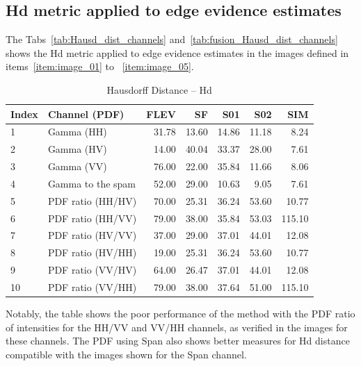 \documentclass[remotesensing,article,submit,pdftex,moreauthors]{Definitions/mdpi}
\begin{document}
\subsection{Hd metric applied to edge evidence estimates}
The Tabs~\eqref{tab:Hausd_dist_channels} and~\eqref{tab:fusion_Hausd_dist_channels} shows the Hd metric applied to edge evidence estimates in the images defined in items~\ref{item:image_01} to ~\ref{item:image_05}.
\begin{table}[hbt!]
	\centering
	\caption{Hausdorff Distance -- Hd}\label{tab:Hausd_dist_channels}
	\begin{tabular}{@{}llrrrrr@{}} \toprule
		 Index & Channel (PDF) & FLEV   & SF    & S01    & S02    & SIM\\ \midrule
	1	&Gamma (HH)            & 31.78  & 13.60 & 14.86  & 11.18  &  8.24\\
	2	&Gamma (HV)            & 14.00  & 40.04 & 33.37  & 28.00  &  7.61\\ 
        3   &Gamma (VV)        & 76.00  & 22.00 & 35.84  & 11.66  &  8.06\\
        4   &Gamma to the spam & 52.00  & 29.00 & 10.63  &  9.05  &  7.61\\
        5   &PDF ratio (HH/HV) & 70.00  & 25.31 & 36.24  & 53.60  & 10.77\\
        6   &PDF ratio (HH/VV) & 79.00  & 38.00 & 35.84  & 53.03  &115.10\\
        7   &PDF ratio (HV/VV) & 37.00  & 29.00 & 37.01  & 44.01  & 12.08\\
        8   &PDF ratio (HV/HH) & 19.00  & 25.31 & 36.24  & 53.60  & 10.77\\
        9   &PDF ratio (VV/HV) & 64.00  & 26.47 & 37.01  & 44.01  & 12.08\\
        10  &PDF ratio (VV/HH) & 79.00  & 38.00 & 37.64  & 51.00  &115.10\\
  \bottomrule
	\end{tabular}
\end{table}

Notably, the table shows the poor performance of the method with the PDF ratio of intensities for the HH/VV and VV/HH channels, as verified in the images for these channels. The PDF using Span also shows better measures for Hd distance compatible with the images shown for the Span channel.
\end{document}
